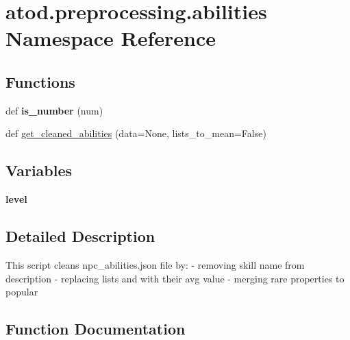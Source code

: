 \hypertarget{namespaceatod_1_1preprocessing_1_1abilities}{}\section{atod.\+preprocessing.\+abilities Namespace Reference}
\label{namespaceatod_1_1preprocessing_1_1abilities}
\subsection*{Functions}
\begin{DoxyCompactItemize}
\item 
def {\bfseries is\+\_\+number} (num)\hypertarget{namespaceatod_1_1preprocessing_1_1abilities_a93c8652df351168068d544d74cdaddf7}{}\label{namespaceatod_1_1preprocessing_1_1abilities_a93c8652df351168068d544d74cdaddf7}

\item 
def \hyperlink{namespaceatod_1_1preprocessing_1_1abilities_aa54fc7fcd063953eb37da1690f27e4d0}{get\+\_\+cleaned\+\_\+abilities} (data=None, lists\+\_\+to\+\_\+mean=False)
\end{DoxyCompactItemize}
\subsection*{Variables}
\begin{DoxyCompactItemize}
\item 
{\bfseries level}\hypertarget{namespaceatod_1_1preprocessing_1_1abilities_a00d22e91260dc1cde5aec1374b3bd7ac}{}\label{namespaceatod_1_1preprocessing_1_1abilities_a00d22e91260dc1cde5aec1374b3bd7ac}

\end{DoxyCompactItemize}


\subsection{Detailed Description}
\begin{DoxyVerb}This script cleans npc_abilities.json file by:
    - removing skill name from description
    - replacing lists and with their avg value
    - merging rare properties to popular
\end{DoxyVerb}
 

\subsection{Function Documentation}
